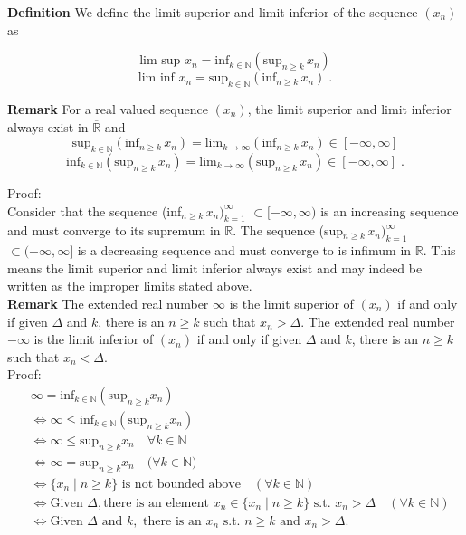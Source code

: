 \documentclass[a4paper]{article}
\begin{document}
{\bf Definition} We define the limit superior and limit inferior of the sequence $(x_n)$ as

$$\text{lim sup } x_n = \text{inf}_{k\in \mathbb{N}} (\text{sup}_{n \geq k} \, x_n)$$
$$\text{lim inf } x_n =\text{sup}_{k \in \mathbb{N}} (\text{inf}_{n\geq k} \, x_n) \;.$$

{\bf Remark} For a real valued sequence $(x_n)$, the limit superior and limit inferior always exist in $\overline{\mathbb{R}}$ and 
$$\text{sup}_{k \in \mathbb{N}} (\text{inf}_{n\geq k} \, x_n) = \text{lim}_{k\rightarrow \infty} (\text{inf}_{n\geq k} \, x_n) \in [-\infty, \infty]$$
$$\text{inf}_{k \in \mathbb{N}} (\text{sup}_{n\geq k} \, x_n) = \text{lim}_{k\rightarrow \infty} (\text{sup}_{n\geq k} \, x_n) \in [-\infty, \infty] \;.$$

Proof:\\

Consider that the sequence (inf$_{n\geq k}\, x_n)_{k=1}^{\infty}$ $\subset [-\infty, \infty)$ is an increasing sequence and must converge to its supremum in $\overline{\mathbb{R}}$. The sequence (sup$_{n\geq k}\, x_n)_{k=1}^{\infty}$ $\subset (-\infty, \infty]$ is a decreasing sequence and must converge to is infimum in $\overline{\mathbb{R}}$. This means the limit superior and limit inferior always exist and may indeed be written as the improper limits stated above.\\

{\bf Remark} The extended real number $\infty$ is the limit superior of $(x_n)$ if and only if given $\Delta$ and $k$, there is an $n\geq k$ such that $x_n > \Delta$. The extended real number $-\infty$ is the limit inferior of $(x_n)$ if and only if given $\Delta$ and $k$, there is an $n\geq k$ such that $x_n < \Delta$.\\

Proof:
\begin{align*}
&\infty = \text{inf}_{k \in \mathbb{N}}(\text{sup}_{n\geq k} x_n) \\
&\iff \infty \leq \text{inf}_{k \in \mathbb{N}}(\text{sup}_{n\geq k} x_n)\\
&\iff \infty \leq \text{sup}_{n\geq k} x_n   \quad \forall k \in \mathbb{N}\\
&\iff \infty=\text{sup}_{n\geq k} x_n  \quad (\forall k \in \mathbb{N)}\\
&\iff \{x_n \;|\; n\geq k\} \text{ is not bounded above} \quad (\forall k \in \mathbb{N})\\
&\iff \text{Given } \Delta, \text{there is an element } x_n \in \{x_n \;|\; n\geq k\} \text{ s.t. } x_n> \Delta \quad (\forall k \in \mathbb{N})\\
&\iff \text{Given }\Delta \text{ and } k, \text{ there is an } x_n \text{ s.t. } n\geq k \text{ and } x_n > \Delta.
\end{align*}
\end{document}
